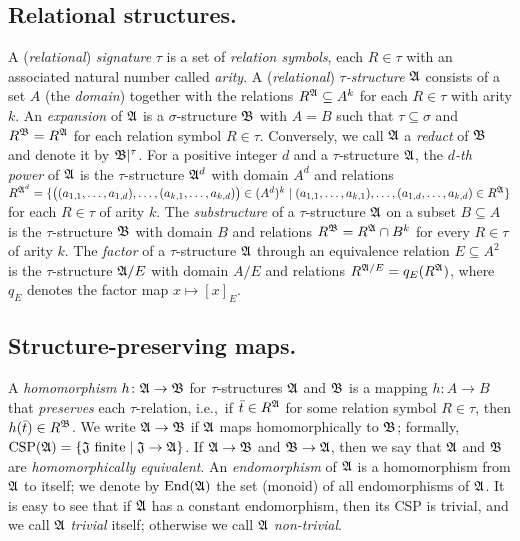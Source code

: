 \subsection*{Relational structures.} 
%
A (\emph{relational}) \emph{signature} $\tau$ is a set of \emph{relation symbols}, each $R\in\tau$ with an associated natural number called \emph{arity}. 
%
A (\emph{relational}) \emph{$\tau$-structure} $\mathfrak{A}$ consists of a set $A$ (the \emph{domain}) together with the relations $R^{\mathfrak{A}}\subseteq A^{k}$ for each $R\in \tau$ with arity $k$.
%
An \emph{expansion} of $\mathfrak{A}$ is a $\sigma$-structure $ \mathfrak{B}$ with $A=B$ such that $ \tau\subseteq \sigma$ and $R^{\mathfrak{B}}=R^{\mathfrak{A}}$ for each relation symbol $R\in \tau$. Conversely, we call $\mathfrak{A}$ a \emph{reduct} of $\mathfrak{B}$ and denote it by $\mathfrak{B}|^{\tau}$.  
%
For a positive integer $d$ and a $\tau$-structure $\mathfrak{A}$, the \emph{$d$-th power} of $\mathfrak{A}$ is the $\tau$-structure $\mathfrak{A}^d$ with domain $A^d$ and relations $R^{\mathfrak{A}^d}=\{\big((a_{1,1},\dots, a_{1,d}),\dots, (a_{k,1},\dots, a_{k,d})\big)\in (A^d)^k \mid  (a_{1,1},\dots, a_{k,1}),\dots, (a_{1,d},\dots, a_{k,d}) \in R^{\mathfrak{A}}   \}$ for each $R\in \tau$ of arity $k$.
%
The \emph{substructure} of a $\tau$-structure $\mathfrak{A}$ on a subset $B\subseteq A$ is the $\tau$-structure $\mathfrak{B}$ with domain $B$ and relations $R^{\mathfrak{B}}=R^{\mathfrak{A}}\cap B^k$ for every $R\in \tau$ of arity $k$.
%
The \emph{factor} of a $\tau$-structure $\mathfrak{A}$ through an equivalence relation $E\subseteq A^2$ is the $\tau$-structure $\mathfrak{A}/{E}$ with domain $A/E$ and relations $R^{\mathfrak{A}/{E}}= q_E(R^{\mathfrak{A}})$, where $q_E$ denotes the factor map $x\mapsto [x]_E$.  
% 

\subsection*{Structure-preserving maps.} A \emph{homomorphism} $h\colon \mathfrak{A} \rightarrow \mathfrak{B}$ for $\tau$-structures $\mathfrak{A}$ and $\mathfrak{B}$ is a mapping $h\colon  A\rightarrow B$ that \emph{preserves} each $\tau$-relation, i.e.,~if $ \bar{t} \in R^{\mathfrak{A}}$ for some  relation symbol $R\in \tau$, then $h(\bar{t})\in R^{\mathfrak{B}}$.
%
We write $\mathfrak{A} \rightarrow \mathfrak{B}$ if $\mathfrak{A}$ maps homomorphically to $\mathfrak{B}$; formally, 
 $\mathrm{CSP}(\mathfrak{A})=\{\mathfrak{J} \text{ finite} \mid \mathfrak{J} \rightarrow \mathfrak{A}\}$. 
 If $\mathfrak{A} \rightarrow \mathfrak{B}$ and $\mathfrak{B} \rightarrow \mathfrak{A}$, then we say that $\mathfrak{A}$ and $\mathfrak{B}$ are \emph{homomorphically equivalent}. 
% 
 An \emph{endomorphism} of $\mathfrak{A}$ is a homomorphism from $\mathfrak{A}$ to itself; we denote by $\mathrm{End}(\mathfrak{A})$ the set (monoid) of all endomorphisms of $\mathfrak{A}$.  
 It is easy to see that if $\mathfrak{A}$ has a constant endomorphism, then its CSP is trivial, and we call $\mathfrak{A}$ \emph{trivial} itself; otherwise we call $\mathfrak{A}$ \emph{non-trivial}. 

